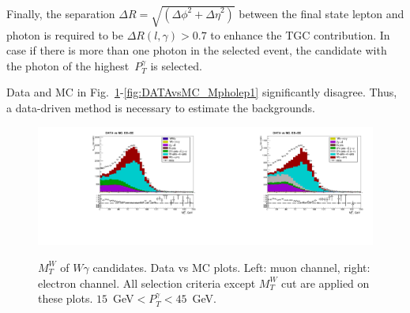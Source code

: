 Finally, the separation $\Delta R=\sqrt{({\Delta\phi}^2+{\Delta\eta}^2)}$ between the final state lepton and photon is required to be $\Delta R(l,\gamma)>0.7$ to enhance the TGC contribution. In case if there is more than one photon in the selected event, the candidate with the photon of the highest~$P_T^{\gamma}$ is selected. 

Data and MC in Fig.~\ref{fig:DATAvsMC_WMt}-\ref{fig:DATAvsMC_Mpholep1} significantly disagree. Thus, a data-driven method is necessary to estimate the backgrounds.

\begin{figure}[htb]
  \begin{center}
   \includegraphics[width=0.5\textwidth]{../figs/figs_v11/MUON_WGamma/PrepareYields/c_TotalDATAvsMC_EtaCommon__WMtVERY_PRELIMINARY.pdf}\includegraphics[width=0.5\textwidth]{../figs/figs_v11/ELECTRON_WGamma/PrepareYields/c_TotalDATAvsMC_EtaCommon__WMtVERY_PRELIMINARY.pdf}
  \caption{ $M_T^W$ of $W\gamma$ candidates. Data vs MC plots. Left: muon channel, right: electron channel. All selection criteria except $M_{T}^W$ cut are applied on these plots. $15$~GeV$<P_T^{\gamma}<45$~GeV. }
  \label{fig:DATAvsMC_WMt}
  \end{center}
\end{figure}

